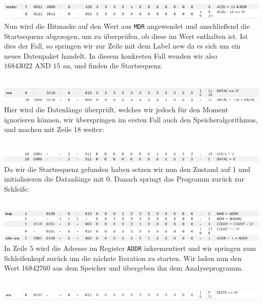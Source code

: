 \documentclass[12pt,titlepage]{article}
\begin{document}
\leavevmode \\
\includegraphics[width=16cm]{listing/row7-8.png}
\leavevmode \\

Nun wird die Bitmaske auf den Wert aus \texttt{MDR} angewendet und anschließend die Startsequenz abgezogen, um
zu überprüfen, ob diese im Wert enthalten ist. Ist dies der Fall, so springen wir zur Zeile mit dem Label \dq new\dq
da es sich um ein neues Datenpaket handelt. In diesem konkreten Fall wenden wir also $16843022 \text{ AND } 15$ an, und finden
die Startsequenz.

\leavevmode \\
\includegraphics[width=16cm]{listing/row9-10.png}
\leavevmode \\

Hier wird die Datenlänge überprüft, welches wir jedoch für den Moment ignorieren können, wir überspringen im ersten Fall auch den Speicheralgorithmus, 
und machen mit Zeile 18 weiter:

\leavevmode \\
\includegraphics[width=16cm]{listing/row18-19.png}
\leavevmode \\

Da wir die Startsequenz gefunden haben setzen wir nun den Zustand auf 1 und initialisieren die Datanlänge mit 0. Danach springt
das Programm zurück zur Schleife:

\leavevmode \\
\includegraphics[width=16cm]{listing/row1-5.png}
\leavevmode \\

In Zeile 5 wird die Adresse im Register \texttt{ADDR} inkrementiert und wir springen zum Schleifenkopf zurück um die nächste
Iteration zu starten. Wir laden nun den Wert 16842760 aus dem Speicher und übergeben ihn dem Analyseprogramm.

\leavevmode \\
\includegraphics[width=16cm]{listing/row6.png}
\leavevmode \\
\end{document}
